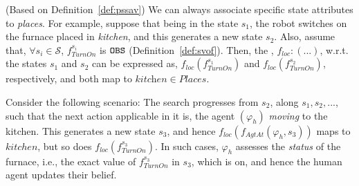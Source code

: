 \documentclass[letterpaper]{article} %
\begin{document}
(Based on Definition~\ref{def:pssav}) We can always associate specific state attributes to \textit{places}. 
For example, suppose that being in the state $s_1$, the robot switches on the furnace placed in \textit{kitchen}, and this generates a new state $s_2$. Also, assume that,
$\forall s_i \in \mathcal{S}$,
$f_{\textit{TurnOn}}^{s_i} 
$ is $\texttt{OBS}$ (Definition~\ref{def:svof}).   
Then, the , $f_{loc} : (...)$, w.r.t. the states
$s_1$ and 
$s_2$ can be expressed as, 
$f_{\textit{loc}} (f_{\textit{TurnOn}}^{s_1} )$ and $f_{\textit{loc}} (f_{\textit{TurnOn}}^{s_2} )$, respectively, and both map to $\textit{kitchen} \in Places$.

Consider the following scenario: The search progresses from $s_2$, along $s_1, s_2, ...$, such that the next action applicable in it is, the agent $(\varphi_h)$ \textit{moving} to the kitchen. This generates a new state $s_3$, and hence $f_{\textit{loc}} (f_{\textit{AgtAt}}(\varphi_h, s_3) )$ maps to $kitchen$, but so does  $f_{\textit{loc}} (f_{\textit{TurnOn}}^{s_3})$. 
In such cases, $\varphi_h$ assesses the \textit{status} of the furnace, i.e., the exact value of $f_{\textit{TurnOn}}^{s_3}$ in $s_3$, which is {\sc on}, and hence the human agent updates their belief.  


\end{document}
